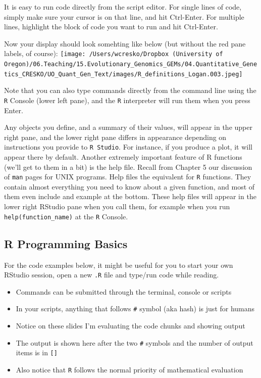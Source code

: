 \documentclass[
]{book}
\providecommand{\tightlist}{%
  \setlength{\itemsep}{0pt}\setlength{\parskip}{0pt}}
\begin{document}
It is easy to run code directly from the script editor. For single lines of code, simply make sure your cursor is on that line, and hit Ctrl-Enter. For multiple lines, highlight the block of code you want to run and hit Ctrl-Enter.

Now your display should look somehting like below (but without the red pane labels, of course):
\texttt{[image: /Users/wcresko/Dropbox (University of Oregon)/06.Teaching/15.Evolutionary\_Genomics\_GEMs/04.Quantitative\_Genetics\_CRESKO/UO\_Quant\_Gen\_Text/images/R\_definitions\_Logan.003.jpeg]}

Note that you can also type commands directly from the command line using the \texttt{R} Console (lower left pane), and the \texttt{R} interpreter will run them when you press Enter.

Any objects you define, and a summary of their values, will appear in the upper right pane, and the lower right pane differs in appearance depending on instructions you provide to \texttt{R\ Studio}. For instance, if you produce a plot, it will appear there by default. Another extremely important feature of R functions (we'll get to them in a bit) is the help file. Recall from Chapter 5 our discussion of \texttt{man} pages for UNIX programs. Help files the equivalent for \texttt{R} functions. They contain almost everything you need to know about a given function, and most of them even include and example at the bottom. These help files will appear in the lower right RStudio pane when you call them, for example when you run \texttt{help(function\_name)} at the \texttt{R} Console.

\hypertarget{r-programming-basics}{%
\subsection{R Programming Basics}\label{r-programming-basics}}

For the code examples below, it might be useful for you to start your own RStudio session, open a new \texttt{.R} file and type/run code while reading.

\begin{itemize}
\tightlist
\item
  Commands can be submitted through the terminal, console or scripts
\item
  In your scripts, anything that follows \texttt{\#} symbol (aka hash) is just for humans
\item
  Notice on these slides I'm evaluating the code chunks and showing output
\item
  The output is shown here after the two \texttt{\#} symbols and the number of output items is in \texttt{{[}{]}}
\item
  Also notice that \texttt{R} follows the normal priority of mathematical evaluation
\end{itemize}
\end{document}
